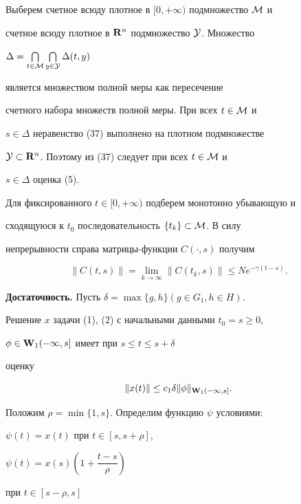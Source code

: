 %





Выберем счетное всюду плотное в $[0,+\infty)$ подмножество ${\cal M}$ и


счетное всюду плотное в $\bold R^n$ подмножество ${\cal Y}$. Множество


$\Delta=\bigcap\limits_{t\in{\cal M}}\bigcap\limits_{y\in{\cal


Y}}\Delta(t,y)$


является множеством полной меры как пересечение


счетного набора множеств полной меры. При всех $t\in{\cal M}$ и


$s\in\Delta$ неравенство (37) выполнено на плотном подмножестве 


${\cal Y}\subset\bold R^n$. Поэтому из (37) следует при всех $t\in{\cal M}$ и


$s\in\Delta$ оценка (5).





Для фиксированного $t\in[0,+\infty)$ подберем монотонно убывающую и


сходящуюся к $t_0$ последовательность $\{t_k\}\subset{\cal M}$. В силу


непрерывности справа матрицы-функции $C(\cdot,s)$ получим


$$


\|C(t,s)\|=\lim_{k\to\infty}\|C(t_k,s)\|\le Ne^{-\gamma(t-s)}.


$$





{\bf Достаточность.} Пусть $\delta=\max\{g,h\}(g\in G_1,h\in H)$.


Решение $x$ задачи (1), (2) с начальными данными $t_0=s\ge0$,


$\phi\in\bold W_1(-\infty,s]$ имеет при $s\le t\le s+\delta$


оценку


$$


\|x(t)\|\le c_1\delta\|\phi\|_{\bold W_1(-\infty,s]}.


$$





Положим $\rho=\min\{1,s\}$. Определим функцию $\psi$ условиями:


$\psi(t)=x(t)$ при $t\in[s,s+\rho]$,


$\psi(t)=x(s)(1+\dfrac{t-s}{\rho})$


при $t\in[s-\rho,s]$


